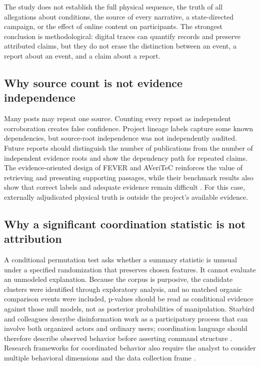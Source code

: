 The study does not establish the full physical sequence, the truth of all allegations about conditions, the source of every narrative, a state-directed campaign, or the effect of online content on participants. The strongest conclusion is methodological: digital traces can quantify records and preserve attributed claims, but they do not erase the distinction between an event, a report about an event, and a claim about a report.

\subsection{Why source count is not evidence independence}

Many posts may repeat one source. Counting every repost as independent corroboration creates false confidence. Project lineage labels capture some known dependencies, but source-root independence was not independently audited. Future reports should distinguish the number of publications from the number of independent evidence roots and show the dependency path for repeated claims. The evidence-oriented design of FEVER and AVeriTeC reinforces the value of retrieving and presenting supporting passages, while their benchmark results also show that correct labels and adequate evidence remain difficult \citep{thorne2018fever,schlichtkrull2023averitec,schlichtkrull2024averitecshared}. For this case, externally adjudicated physical truth is outside the project's available evidence.

\subsection{Why a significant coordination statistic is not attribution}

A conditional permutation test asks whether a summary statistic is unusual under a specified randomization that preserves chosen features. It cannot evaluate an unmodeled explanation. Because the corpus is purposive, the candidate clusters were identified through exploratory analysis, and no matched organic comparison events were included, p-values should be read as conditional evidence against those null models, not as posterior probabilities of manipulation. Starbird and colleagues describe disinformation work as a participatory process that can involve both organized actors and ordinary users; coordination language should therefore describe observed behavior before asserting command structure \citep{starbird2019collaborative}. Research frameworks for coordinated behavior also require the analyst to consider multiple behavioral dimensions and the data collection frame \citep{pacheco2021uncovering,nizzoli2021coordinated,magelinski2022synchronized,ng2023combined}.

